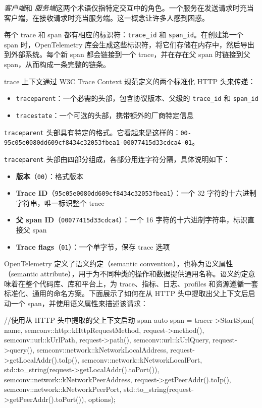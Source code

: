 \emph{客户端}和 \emph{服务端}这两个术语仅指特定交互中的角色。一个服务在发送请求时充当客户端，在接收请求时充当服务端。这一概念让许多人感到困惑。

\label{idx:2022}
每个 trace 和 span 都有相应的标识符：\texttt{trace\_id} 和 \texttt{span\_id}。在创建第一个 span 时，OpenTelemetry 库会生成这些标识符，将它们存储在内存中，然后导出到外部系统。每个新 span 都会链接到一个 trace，并在存在父 span 时链接到父 span，从而构成一条完整的链条。

\label{idx:2023}
trace 上下文通过 W3C Trace Context 规范定义的两个标准化 HTTP 头来传递：

\begin{itemize}
\item \texttt{traceparent}：一个必需的头部，包含协议版本、父级的 \texttt{trace\_id} 和 \texttt{span\_id}
\item \texttt{tracestate}：一个可选的头部，携带额外的厂商特定信息
\end{itemize}

\texttt{traceparent} 头部具有特定的格式。它看起来是这样的：\texttt{00-95c05e0080dd609cf8434c32053fbea1-00077415d33cdca4-01}。

\texttt{traceparent} 头部由四部分组成，各部分用连字符分隔，具体说明如下：

\begin{itemize}
\item \textbf{版本}（\texttt{00}）：格式版本
\item \textbf{Trace ID}（\texttt{95c05e0080dd609cf8434c32053fbea1}）：一个 32 字符的十六进制字符串，唯一标识整个 trace
\item \textbf{父 span ID}（\texttt{00077415d33cdca4}）：一个 16 字符的十六进制字符串，标识直接父 span
\item \textbf{Trace flags}（\texttt{01}）：一个单字节，保存 trace 选项
\end{itemize}

\label{idx:2024}
OpenTelemetry 定义了语义约定（semantic convention），也称为语义属性（semantic attribute），用于为不同种类的操作和数据提供通用名称。语义约定意味着在整个代码库、库和平台上，为 trace、指标、日志、profiles 和资源遵循一套标准化、通用的命名方案。下面展示了如何在从 HTTP 头中提取出父上下文后启动一个 span，并使用语义属性来描述该请求：

\begin{codebox}[cpp]
  //使用从 HTTP 头中提取的父上下文启动 span
  auto span = tracer->StartSpan(
      name,
      {{semconv::http::kHttpRequestMethod, request->method()},
       {semconv::url::kUrlPath, request->path()},
       {semconv::url::kUrlQuery, request->query()},
       {semconv::network::kNetworkLocalAddress, request->getLocalAddr().toIp()},
       {semconv::network::kNetworkLocalPort,
        std::to_string(request->getLocalAddr().toPort())},
       {semconv::network::kNetworkPeerAddress, request->getPeerAddr().toIp()},
       {semconv::network::kNetworkPeerPort,
        std::to_string(request->getPeerAddr().toPort())}},
      options);
\end{codebox}


